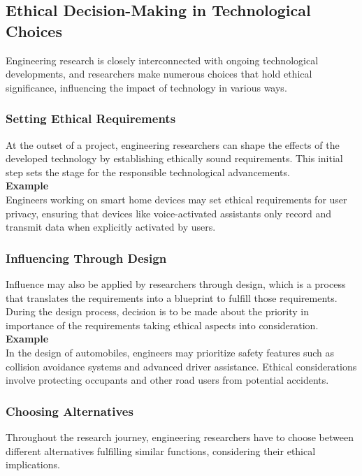 \documentclass{article}
\begin{document}
	\subsection{Ethical Decision-Making in Technological Choices}
	Engineering research is closely interconnected with ongoing technological developments, and researchers
	make numerous choices that hold ethical significance, influencing the impact of technology in various ways.

	\subsubsection{Setting Ethical Requirements}
	At the outset of a project, engineering researchers can shape the effects of the developed technology by
	establishing ethically sound requirements. This initial step sets the stage for the responsible
	technological advancements. \\

	\noindent \textbf{Example} \\
	Engineers working on smart home devices may set ethical requirements for user privacy, ensuring that
	devices like voice-activated assistants only record and transmit data when explicitly activated by users.

	\subsubsection{Influencing Through Design}
	Influence may also be applied by researchers through design, which is a process that translates the
	requirements into a blueprint to fulfill those requirements.
	During the design process, decision is to be made about the priority in importance of the requirements
	taking ethical aspects into consideration. \\
	
	\noindent \textbf{Example} \\
	In the design of automobiles, engineers may prioritize safety features such as collision avoidance systems
	and advanced driver assistance.
	Ethical considerations involve protecting occupants and other road users from potential accidents.
	
	\subsubsection{Choosing Alternatives}
	Throughout the research journey, engineering researchers have to choose between different alternatives
	fulfilling similar functions, considering their ethical implications. \\
\end{document}
